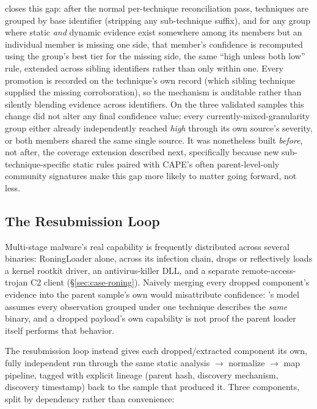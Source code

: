  closes this gap: after the
normal per-technique reconciliation pass, techniques are grouped by
base identifier (stripping any sub-technique suffix), and for any group
where static \emph{and} dynamic evidence exist somewhere among its
members but an individual member is missing one side, that member's
confidence is recomputed using the group's best tier for the missing
side, the same ``high unless both low'' rule, extended across sibling
identifiers rather than only within one. Every promotion is recorded
on the technique's own record (which sibling technique supplied the
missing corroboration), so the mechanism is auditable rather than
silently blending evidence across identifiers. On the three validated
samples this change did not alter any final confidence value: every
currently-mixed-granularity group either already independently reached
\emph{high} through its own source's severity, or both members shared
the same single source. It was nonetheless built \emph{before}, not
after, the coverage extension described next, specifically because new
sub-technique-specific static rules paired with CAPE's often
parent-level-only community signatures make this gap more likely to
matter going forward, not less.

\subsection{The Resubmission Loop}
\label{sec:resubmission}

Multi-stage malware's real capability is frequently distributed across
several binaries: RoningLoader alone, across its infection chain,
drops or reflectively loads a kernel rootkit driver, an antivirus-killer
DLL, and a separate remote-access-trojan C2 client
(\S\ref{sec:case-roning}). Naively merging every dropped component's
evidence into the parent sample's own  would
misattribute confidence: 's model assumes every
observation grouped under one technique describes the \emph{same}
binary, and a dropped payload's own capability is not proof the parent
loader itself performs that behavior.

The resubmission loop instead gives each dropped/extracted component
its own, fully independent run through the same static
analysis $\rightarrow$ normalize $\rightarrow$ map pipeline, tagged
with explicit lineage (parent hash, discovery mechanism, discovery
timestamp) back to the sample that produced it. Three components,
split by dependency rather than convenience:

